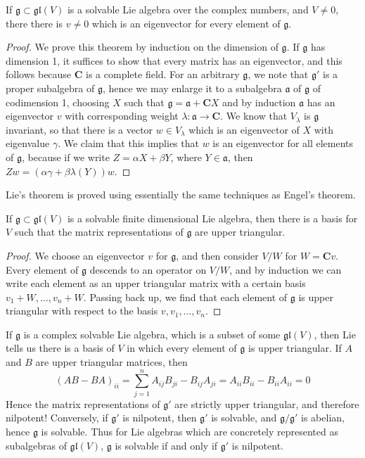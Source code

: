 \begin{lemma}
    If $\mathfrak{g} \subset \mathfrak{gl}(V)$ is a solvable Lie algebra over the complex numbers, and $V \neq 0$, there there is $v \neq 0$ which is an eigenvector for every element of $\mathfrak{g}$.
\end{lemma}
\begin{proof}
    We prove this theorem by induction on the dimension of $\mathfrak{g}$. If $\mathfrak{g}$ has dimension 1, it suffices to show that every matrix has an eigenvector, and this follows because $\mathbf{C}$ is a complete field. For an arbitrary $\mathfrak{g}$, we note that $\mathfrak{g}'$ is a proper subalgebra of $\mathfrak{g}$, hence we may enlarge it to a subalgebra $\mathfrak{a}$ of $\mathfrak{g}$ of codimension 1, choosing $X$ such that $\mathfrak{g} = \mathfrak{a} + \mathbf{C} X$ and by induction $\mathfrak{a}$ has an eigenvector $v$ with corresponding weight $\lambda: \mathfrak{a} \to \mathbf{C}$. We know that $V_\lambda$ is $\mathfrak{g}$ invariant, so that there is a vector $w \in V_\lambda$ which is an eigenvector of $X$ with eigenvalue $\gamma$. We claim that this implies that $w$ is an eigenvector for all elements of $\mathfrak{g}$, because if we write $Z = \alpha X + \beta Y$, where $Y \in \mathfrak{a}$, then $Zw = (\alpha \gamma + \beta \lambda(Y))w$.
\end{proof}

Lie's theorem is proved using essentially the same techniques as Engel's theorem.

\begin{theorem}
    If $\mathfrak{g} \subset \mathfrak{gl}(V)$ is a solvable finite dimensional Lie algebra, then there is a basis for $V$ such that the matrix representations of $\mathfrak{g}$ are upper triangular.
\end{theorem}
\begin{proof}
    We choose an eigenvector $v$ for $\mathfrak{g}$, and then consider $V/W$ for $W = \mathbf{C}v$. Every element of $\mathfrak{g}$ descends to an operator on $V/W$, and by induction we can write each element as an upper triangular matrix with a certain basis $v_1 + W, \dots, v_n + W$. Passing back up, we find that each element of $\mathfrak{g}$ is upper triangular with respect to the basis $v, v_1, \dots, v_n$.
\end{proof}

If $\mathfrak{g}$ is a complex solvable Lie algebra, which is a subset of some $\mathfrak{gl}(V)$, then Lie tells us there is a basis of $V$ in which every element of $\mathfrak{g}$ is upper triangular. If $A$ and $B$ are upper triangular matrices, then
%
\[ (AB - BA)_{ii} = \sum_{j = 1}^n A_{ij}B_{ji} - B_{ij}A_{ji} = A_{ii}B_{ii} - B_{ii}A_{ii} = 0 \]
%
Hence the matrix representations of $\mathfrak{g}'$ are strictly upper triangular, and therefore nilpotent! Conversely, if $\mathfrak{g}'$ is nilpotent, then $\mathfrak{g}'$ is solvable, and $\mathfrak{g}/\mathfrak{g}'$ is abelian, hence $\mathfrak{g}$ is solvable. Thus for Lie algebras which are concretely represented as subalgebras of $\mathfrak{gl}(V)$, $\mathfrak{g}$ is solvable if and only if $\mathfrak{g}'$ is nilpotent.


